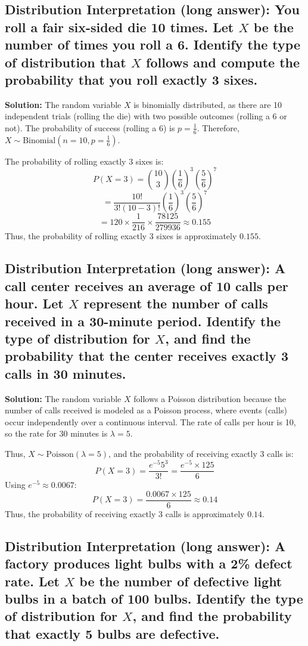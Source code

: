 \documentclass[12pt]{article}
\begin{document}
\subsection{Distribution Interpretation (long answer): You roll a fair six-sided die 10 times. Let \( X \) be the number of times you roll a 6. Identify the type of distribution that \( X \) follows and compute the probability that you roll exactly 3 sixes.}

\textbf{Solution:}  
The random variable \( X \) is binomially distributed, as there are 10 independent trials (rolling the die) with two possible outcomes (rolling a 6 or not). The probability of success (rolling a 6) is \( p = \frac{1}{6} \). Therefore, \( X \sim \text{Binomial}(n = 10, p = \frac{1}{6}) \).

The probability of rolling exactly 3 sixes is:
\[
P(X = 3) = \binom{10}{3} \left(\frac{1}{6}\right)^3 \left(\frac{5}{6}\right)^7
\]
\[
= \frac{10!}{3!(10-3)!} \left(\frac{1}{6}\right)^3 \left(\frac{5}{6}\right)^7
\]
\[
= 120 \times \frac{1}{216} \times \frac{78125}{279936} \approx 0.155
\]
Thus, the probability of rolling exactly 3 sixes is approximately \( 0.155 \).

\subsection{Distribution Interpretation (long answer): A call center receives an average of 10 calls per hour. Let \( X \) represent the number of calls received in a 30-minute period. Identify the type of distribution for \( X \), and find the probability that the center receives exactly 3 calls in 30 minutes.}

\textbf{Solution:}  
The random variable \( X \) follows a Poisson distribution because the number of calls received is modeled as a Poisson process, where events (calls) occur independently over a continuous interval. The rate of calls per hour is 10, so the rate for 30 minutes is \( \lambda = 5 \).

Thus, \( X \sim \text{Poisson}(\lambda = 5) \), and the probability of receiving exactly 3 calls is:
\[
P(X = 3) = \frac{e^{-5} 5^3}{3!} = \frac{e^{-5} \times 125}{6}
\]
Using \( e^{-5} \approx 0.0067 \):
\[
P(X = 3) = \frac{0.0067 \times 125}{6} \approx 0.14
\]
Thus, the probability of receiving exactly 3 calls is approximately \( 0.14 \).

\subsection{Distribution Interpretation (long answer): A factory produces light bulbs with a 2\% defect rate. Let \( X \) be the number of defective light bulbs in a batch of 100 bulbs. Identify the type of distribution for \( X \), and find the probability that exactly 5 bulbs are defective.}
\end{document}
